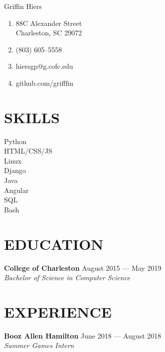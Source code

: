 \documentclass[letterpaper,14pt]{extarticle}
\begin{document}
\begin{multicols}{2}
  \vspace*{25pt}
  \huge {Grif\phantom{}f\phantom{}in Hiers}
  \normalsize \\

  \begin{enumerate}[noitemsep]
    \item[]{\faHome{} 88C Alexander Street\\Charleston, SC 29072}
    \item[]{\faPhone{} (803) 605--5558}
    \item[]{\faEnvelope{} hiersgp@g.cofc.edu}
    \item[]{\faGithub{} github.com/grifffin}
  \end{enumerate}
\end{multicols}
\vspace*{13pt}

\section*{SKILLS}
\begin{multicols}{4}
  Python\\
  HTML/CSS/JS\\
  Linux\\
  Django\\
  Java\\
  Angular\\
  SQL\\
  Bash\\
\end{multicols}
\section*{EDUCATION}
  \textbf{College of Charleston}
  \hspace*{\fill}
  \textcolor{color2}{August 2015 --- May 2019}
  \\
  \textcolor{color2}{
    \textit{
      \qquad{} Bachelor of Science in Computer Science
    }
  }
\section*{EXPERIENCE}
\textbf{Booz Allen Hamilton}
  \hspace*{\fill}
  \textcolor{color2}{June 2018 --- August 2018}
  \\ 
  \textcolor{color2}{
    \textit{
      \qquad{} Summer Games Intern
    }
  }
\end{document}
